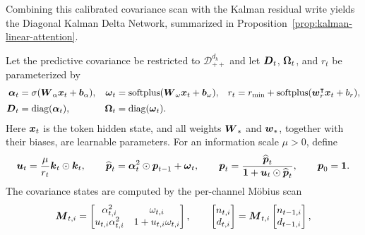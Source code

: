 \documentclass[11pt,letterpaper,logo]{yalearxiv}
\begin{document}
Combining this calibrated covariance scan with the Kalman residual write yields the Diagonal
Kalman Delta Network, summarized in Proposition~\ref{prop:kalman-linear-attention}.
\label{prop:kalman-linear-attention}
\begin{tcolorbox}[
  title={Proposition~\thedefinition: Diagonal Kalman Delta Network},
  breakable,
  colback=blue!7,
  colbacktitle=blue!22,
  colframe=blue!45!black,
  coltitle=black,
  fonttitle=\bfseries,
  boxrule=0.4pt,
  arc=1pt,
  left=5pt,
  right=5pt,
  top=5pt,
  bottom=5pt
]
Let the predictive covariance be restricted to $\mathcal{D}_{++}^{d_k}$ and let
$\boldsymbol{D}_t$, $\boldsymbol{\Omega}_t$, and $r_t$ be parameterized by
\begin{equation}
\begin{aligned}
  \boldsymbol{\alpha}_t &= \sigma(\boldsymbol{W}_{\alpha}\boldsymbol{x}_t+\boldsymbol{b}_{\alpha}),
  &
  \boldsymbol{\omega}_t &= \operatorname{softplus}(\boldsymbol{W}_{\omega}\boldsymbol{x}_t+\boldsymbol{b}_{\omega}),
  &
  r_t &= r_{\min}+\operatorname{softplus}(\boldsymbol{w}_{r}^{\intercal}\boldsymbol{x}_t+b_r),
  \\[2pt]
  \boldsymbol{D}_t &= \operatorname{diag}(\boldsymbol{\alpha}_t),
  &
  \boldsymbol{\Omega}_t &= \operatorname{diag}(\boldsymbol{\omega}_t).
\end{aligned}
\label{eq:kla-box-parameterization}
\end{equation}
Here $\boldsymbol{x}_t$ is the token hidden state, and all weights $\boldsymbol{W}_{\ast}$ and
$\boldsymbol{w}_{\ast}$, together with their biases, are learnable parameters.
For an information scale $\mu>0$, define
\begin{equation}
  \boldsymbol{u}_t=\frac{\mu}{r_t}\boldsymbol{k}_t\odot\boldsymbol{k}_t,
  \qquad
  \widehat{\boldsymbol{p}}_t
  =\boldsymbol{\alpha}_t^2\odot\boldsymbol{p}_{t-1}+\boldsymbol{\omega}_t,
  \qquad
  \boldsymbol{p}_t
  =\frac{\widehat{\boldsymbol{p}}_t}
    {\boldsymbol{1}+\boldsymbol{u}_t\odot\widehat{\boldsymbol{p}}_t},
  \qquad
  \boldsymbol{p}_0=\boldsymbol{1}.
  \label{eq:kla-box-cov-update}
\end{equation}
The covariance states are computed by the per-channel M\"obius scan
\begin{equation}
  \ve{M}_{t,i}
  =
  \begin{bmatrix}
    \alpha_{t,i}^2 & \omega_{t,i}\\
    u_{t,i}\alpha_{t,i}^2 & 1+u_{t,i}\omega_{t,i}
  \end{bmatrix},
  \qquad
  \begin{bmatrix}n_{t,i}\\ d_{t,i}\end{bmatrix}
  =
  \ve{M}_{t,i}
  \begin{bmatrix}n_{t-1,i}\\ d_{t-1,i}\end{bmatrix},

\end{equation}
\end{tcolorbox}
\end{document}

